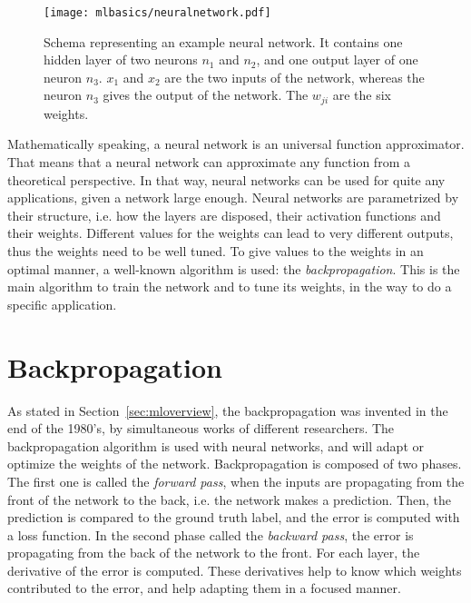 \begin{figure}[t!]
  \centering
  \texttt{[image: mlbasics/neuralnetwork.pdf]}
  \caption[Neural network example]{Schema representing an example neural network. It contains one hidden layer of two neurons $n_1$ and $n_2$, and one output layer of one neuron $n_3$. $x_1$ and $x_2$ are the two inputs of the network, whereas the neuron $n_3$ gives the output of the network. The $w_{ji}$ are the six weights.}
  \label{fig:neuralnetwork}
\end{figure}

Mathematically speaking, a neural network is an universal function approximator. That means that a neural network can approximate any function from a theoretical perspective. In that way, neural networks can be used for quite any applications, given a network large enough. Neural networks are parametrized by their structure, i.e. how the layers are disposed, their activation functions and their weights. Different values for the weights can lead to very different outputs, thus the weights need to be well tuned. To give values to the weights in an optimal manner, a well-known algorithm is used: the \emph{backpropagation}. This is the main algorithm to train the network and to tune its weights, in the way to do a specific application.

\section{Backpropagation}
\label{sec:backprop}
As stated in Section~\ref{sec:mloverview}, the backpropagation was invented in the end of the 1980's, by simultaneous works of different researchers. The backpropagation algorithm is used with neural networks, and will adapt or optimize the weights of the network. Backpropagation is composed of two phases. The first one is called the \emph{forward pass}, when the inputs are propagating from the front of the network to the back, i.e. the network makes a prediction. Then, the prediction is compared to the ground truth label, and the error is computed with a loss function. In the second phase called the \emph{backward pass}, the error is propagating from the back of the network to the front. For each layer, the derivative of the error is computed. These derivatives help to know which weights contributed to the error, and help adapting them in a focused manner.

